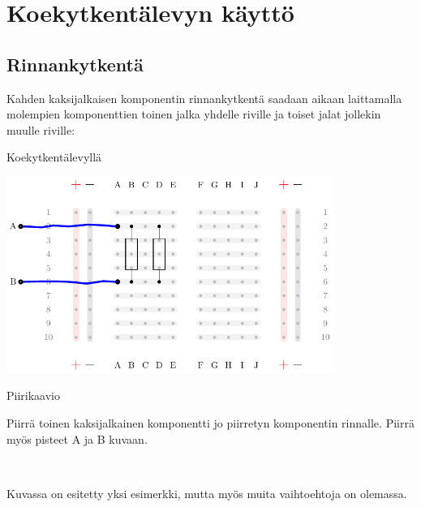 \chapter{Koekytkentälevyn käyttö}

\section{Rinnankytkentä}
Kahden kaksijalkaisen komponentin rinnankytkentä saadaan aikaan laittamalla molempien komponenttien toinen jalka yhdelle riville ja toiset jalat jollekin muulle riville:


\begin{minipage}{0.75\textwidth}
\begin{center}
Koekytkentälevyllä
\end{center}
\includegraphics[width=0.8\textwidth]{kuvat/kuva1.pdf}
\end{minipage}%
\begin{minipage}{0.25\textwidth}
\begin{center}
Piirikaavio
\end{center}
\end{minipage}
\begin{tcolorbox}[colback=yellow!10, title={Testaa taitosi!},colbacktitle=orange]
Piirrä toinen kaksijalkainen komponentti jo piirretyn komponentin rinnalle. Piirrä myös pisteet A ja B kuvaan.

\\
\begin{solution}
Kuvassa on esitetty yksi esimerkki, mutta myös muita vaihtoehtoja on olemassa.
\end{solution}
\end{tcolorbox}

